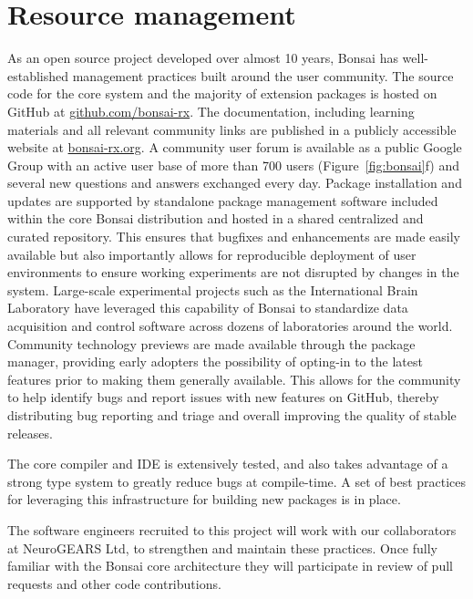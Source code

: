 \section{Resource management}
%
As an open source project developed over almost 10 years, Bonsai 
has well-established management practices built around the user community.
%
The source code for the core system and the majority of extension packages
is hosted on GitHub at \url{github.com/bonsai-rx}.
%
The documentation, including learning materials and all relevant community
links are published in a publicly accessible website at \url{bonsai-rx.org}.
%
A community user forum is available as a public Google Group with an active
user base of more than 700 users (Figure~\ref{fig:bonsai}f) and several
new questions and answers exchanged every day.
%
Package installation and updates are supported by standalone package
management software included within the core Bonsai distribution and hosted
in a shared centralized and curated repository.
%
This ensures that bugfixes and enhancements are made easily available but
also importantly allows for reproducible deployment of user environments
to ensure working experiments are not disrupted by changes in the system.
Large-scale experimental projects such as the International Brain Laboratory
have leveraged this capability of Bonsai to standardize data acquisition and
control software across dozens of laboratories around the world.
%
Community technology previews are made available through the package manager,
providing early adopters the possibility of opting-in to the latest features
prior to making them generally available. This allows for the community
to help identify bugs and report issues with new features on GitHub, thereby
distributing bug reporting and triage and overall improving the quality of
stable releases.

The core compiler and IDE is extensively tested, and also takes advantage of
a strong type system to greatly reduce bugs at compile-time. A set of best
practices for leveraging this infrastructure for building new packages is
in place.

The software engineers recruited to this project will work with our
collaborators at NeuroGEARS Ltd, to strengthen and maintain these
practices.  Once fully familiar with the Bonsai core architecture they
will participate in review of pull requests and other code contributions.


